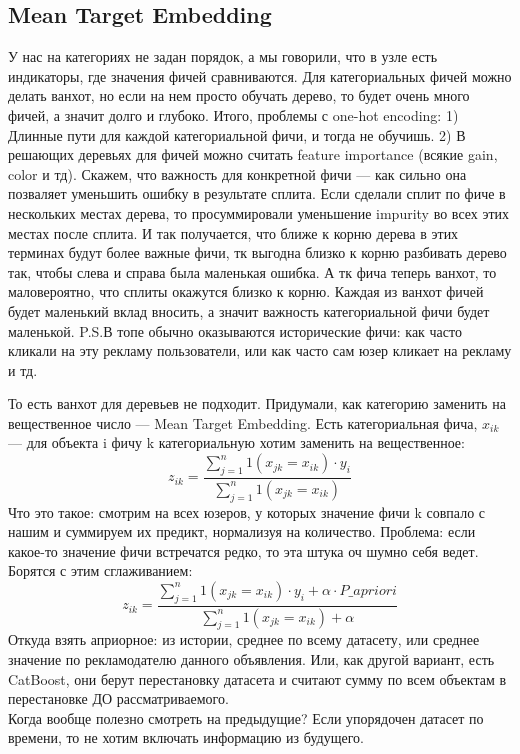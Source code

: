 \documentclass[12pt]{article}
\begin{document}
\subsection{Mean Target Embedding}

\quad У нас на категориях не задан порядок, а мы говорили, что в узле есть индикаторы, где значения фичей сравниваются. Для категориальных фичей можно делать ванхот, но если на нем просто обучать дерево, то будет очень много фичей, а значит долго и глубоко. Итого, проблемы с one-hot encoding: 1) Длинные пути для каждой категориальной фичи, и тогда не обучишь. 2) В решающих деревьях для фичей можно считать feature importance (всякие gain, color и тд). Скажем, что важность для конкретной фичи --- как сильно она позваляет уменьшить ошибку в результате сплита. Если сделали сплит по фиче в нескольких местах дерева, то просуммировали уменьшение impurity во всех этих местах после сплита. И так получается, что ближе к корню дерева в этих терминах будут более важные фичи, тк выгодна близко к корню разбивать дерево так, чтобы слева и справа была маленькая ошибка. А тк фича теперь ванхот, то маловероятно, что сплиты окажутся близко к корню. Каждая из ванхот фичей будет маленький вклад вносить, а значит важность категориальной фичи будет маленькой. P.S.В топе обычно оказываются исторические фичи: как часто кликали на эту рекламу пользователи, или как часто сам юзер кликает на рекламу и тд.

\quad То есть ванхот для деревьев не подходит. Придумали, как категорию заменить на вещественное число --- Mean Target Embedding. Есть категориальная фича, $x_{ik}$ --- для объекта i фичу k категориальную хотим заменить на вещественное:
$$z_{ik} = \frac{\sum_{j=1}^n {1(x_{jk} = x_{ik})\cdot y_i}}{\sum_{j=1}^n {1(x_{jk} = x_{ik})}}$$
Что это такое: смотрим на всех юзеров, у которых значение фичи k совпало с нашим и суммируем их предикт, нормализуя на количество. Проблема: если какое-то значение фичи встречатся редко, то эта штука оч шумно себя ведет. Борятся с этим сглаживанием:
$$z_{ik} = \frac{\sum_{j=1}^n {1(x_{jk} = x_{ik})\cdot y_i + \alpha \cdot P\_apriori}}{\sum_{j=1}^n {1(x_{jk} = x_{ik}) + \alpha}}$$
Откуда взять априорное: из истории, среднее по всему датасету, или среднее значение по рекламодателю данного объявления. Или, как другой вариант, есть CatBoost, они берут перестановку датасета и считают сумму по всем объектам в перестановке ДО рассматриваемого.\\
Когда вообще полезно смотреть на предыдущие? Если упорядочен датасет по времени, то не хотим включать информацию из будущего.
\end{document}
